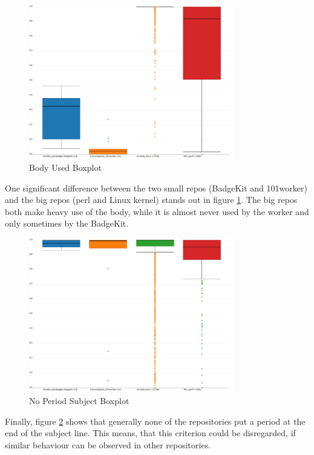 \begin{figure}[p]
    \centering
    \includegraphics[width=0.8\textwidth]{img/body_used.pdf}
    \caption{Body Used Boxplot}
    \label{fig:bp_body_used}
\end{figure}

One significant difference between the two small repos (BadgeKit and 101worker) and the big repos (perl and Linux kernel) stands out in figure \ref{fig:bp_body_used}. The big repos both make heavy use of the body, while it is almost never used by the worker and only sometimes by the BadgeKit.

\begin{figure}[p]
    \centering
    \includegraphics[width=0.8\textwidth]{img/no_period_subject.pdf}
    \caption{No Period Subject Boxplot}
    \label{fig:bp_no_period_subject}
\end{figure}

Finally, figure \ref{fig:bp_no_period_subject} shows that generally none of the repositories put a period at the end of the subject line. This means, that this criterion could be disregarded, if similar behaviour can be observed in other repositories.

